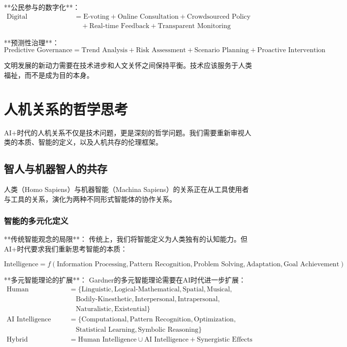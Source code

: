 **公民参与的数字化**：
\begin{align}
\text{Digital Participation} &= \text{E-voting} + \text{Online Consultation} + \text{Crowdsourced Policy} \\
&\quad + \text{Real-time Feedback} + \text{Transparent Monitoring}
\end{align}

**预测性治理**：
\begin{equation}
\text{Predictive Governance} = \text{Trend Analysis} + \text{Risk Assessment} + \text{Scenario Planning} + \text{Proactive Intervention}
\end{equation}

\begin{center}
文明发展的新动力需要在技术进步和人文关怀之间保持平衡。技术应该服务于人类福祉，而不是成为目的本身。
\end{center}

\section{人机关系的哲学思考}

AI+时代的人机关系不仅是技术问题，更是深刻的哲学问题。我们需要重新审视人类的本质、智能的定义，以及人机共存的伦理框架。

\subsection{智人与机器智人的共存}

人类（Homo Sapiens）与机器智能（Machina Sapiens）的关系正在从工具使用者与工具的关系，演化为两种不同形式智能体的协作关系。

\subsubsection{智能的多元化定义} %

**传统智能观念的局限**：
传统上，我们将智能定义为人类独有的认知能力。但AI+时代要求我们重新思考智能的本质：

\begin{equation}
\text{Intelligence} = f(\text{Information Processing}, \text{Pattern Recognition}, \text{Problem Solving}, \text{Adaptation}, \text{Goal Achievement})
\end{equation}

**多元智能理论的扩展**：
Gardner的多元智能理论需要在AI时代进一步扩展：
\begin{align}
\text{Human Intelligence} &= \{\text{Linguistic}, \text{Logical-Mathematical}, \text{Spatial}, \text{Musical}, \\
&\quad \text{Bodily-Kinesthetic}, \text{Interpersonal}, \text{Intrapersonal}, \\
&\quad \text{Naturalistic}, \text{Existential}\} \\
\text{AI Intelligence} &= \{\text{Computational}, \text{Pattern Recognition}, \text{Optimization}, \\
&\quad \text{Statistical Learning}, \text{Symbolic Reasoning}\} \\
\text{Hybrid Intelligence} &= \text{Human Intelligence} \cup \text{AI Intelligence} + \text{Synergistic Effects}
\end{align}

